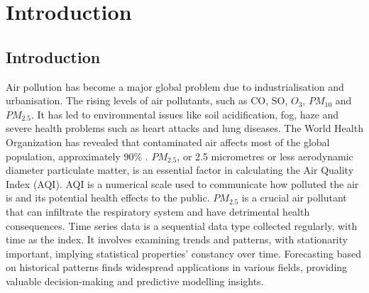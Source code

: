 
\chapter{Introduction} %

\label{c1} %


\section{Introduction}
Air pollution has become a major global problem due to industrialisation and urbanisation. The rising levels of air pollutants,  such as CO,  SO,  $O_3$,  $PM_{10}$ and $PM_{2.5}$. It has led to environmental issues like soil acidification,  fog, haze and severe health problems such as heart attacks and lung diseases. The World Health Organization has revealed that contaminated air affects most of the global population,  approximately 90\% \cite{zhou2019effects}. $PM_{2.5}$,  or 2.5 micrometres or less aerodynamic diameter particulate matter, is an essential factor in calculating the Air Quality Index (AQI). AQI is a numerical scale used to communicate how polluted the air is and its potential health effects to the public. $PM_{2.5}$ is a crucial air pollutant that can infiltrate the respiratory system and have detrimental health consequences. Time series data is a sequential data type collected regularly, with time as the index. It involves examining trends and patterns,  with stationarity important, implying statistical properties' constancy over time. Forecasting based on historical patterns finds widespread applications in various fields,  providing valuable decision-making and predictive modelling insights.
